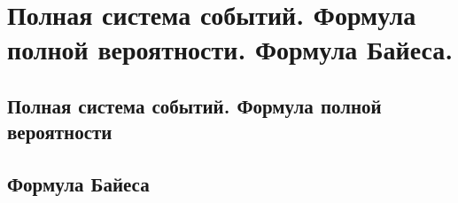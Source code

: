 \chapter{Полная система событий. Формула полной вероятности. Формула Байеса.}
\section{Полная система событий. Формула полной вероятности}
\section{Формула Байеса}
